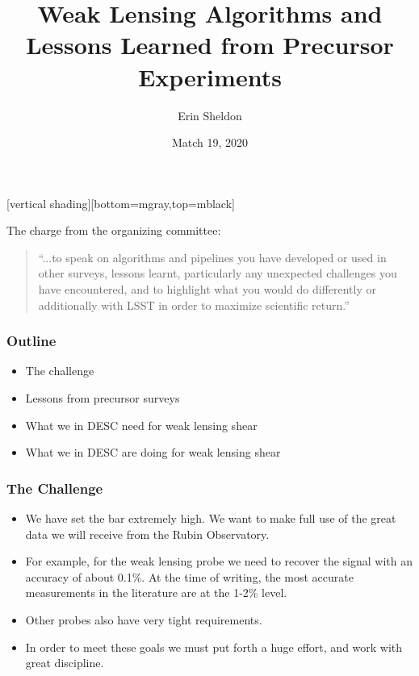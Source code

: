 \documentclass{beamer}
\title{Weak Lensing Algorithms and Lessons Learned from Precursor Experiments}
\author{Erin Sheldon}
\institute{Brookhaven National Laboratory}
\date{Match 19, 2020}
\begin{document}
[vertical shading][bottom=mgray,top=mblack]



%
\frame
{


    {\huge The charge from the organizing committee: }
    \newline

    \begin{quote}
    ``...to speak on algorithms and pipelines you have developed or
    used in other surveys, lessons learnt, particularly any unexpected
    challenges you have encountered, and to highlight what you would do
    differently or additionally with LSST in order to maximize scientific
    return.''
    \end{quote}


}

\frame
{

    \frametitle{Outline}


    \begin{itemize}

        \item The challenge
        \item Lessons from precursor surveys
        \item What we in DESC need for weak lensing shear
        \item What we in DESC are doing for weak lensing shear

    \end{itemize}

}

\frame
{
    \frametitle{The Challenge}


    \begin{itemize}

        \item We have set the bar extremely high.  We want to make full use of the
            great data we will receive from the Rubin Observatory.

        \item For example, for the weak lensing probe we need to recover the
            signal with an accuracy of about 0.1\%.  At the time of writing,
            the most accurate measurements in the literature are at the 1-2\%
            level.

        \item Other probes also have very tight requirements.

        \item In order to meet these goals we must put forth a huge effort, and
            work with great discipline.

    \end{itemize}

}
\end{document}
